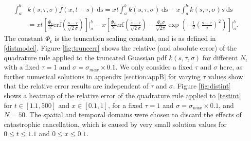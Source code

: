 \begin{equation}
    \begin{split}
\int_a^b&k(s,\tau,\sigma)f(x,t-s)\ \text{ds}=xt\int_a^bk(s,\tau,\sigma)\ \text{ds}-x\int_a^bk(s,\tau,\sigma)s\ \text{ds}\\&=xt\left[\frac{\Phi_c}{2}\text{erf}\left(\frac{s-\tau}{\sqrt{2}\sigma}\right)\right]\bigg|_a^b-x\left[\frac{\Phi_c}{2}\text{erf}\left(\frac{s-\tau}{\sqrt{2}\sigma}\right)-\frac{\Phi_c\sigma}{\sqrt{2\pi}}\exp\left(-\frac{1}{2}\left(\frac{s-\tau}{\sigma}\right)^2 \right)\right]\bigg|_a^b.
    \end{split}
\end{equation}
The constant $\Phi_c$ is the truncation scaling constant, and is as defined in \eqref{distmodel}. Figure \ref{fig:truncerr} shows the relative (and absolute error) of the quadrature rule applied to the truncated Guassian pdf $k(s,\tau,\sigma)$ for different $N$, with a fixed $\tau=1$ and $\sigma=\sigma_{max}\times0.1$. We only consider a fixed $\tau$ and $\sigma$ here, as further numerical solutions in appendix \ref{section:appB} for varying $\tau$ values show that the relative error results are independent of $\tau$ and $\sigma$. Figure \ref{fig:distint} shows a heatmap of the relative error of the quadrature rule applied to \eqref{testint} for $t\in[1.1,500]$ and $x\in[0.1,1]$, for a fixed $\tau=1$ and $\sigma=\sigma_{max}\times0.1$, and $N=50$. The spatial and temporal domains were chosen to discard the effects of catastrophic cancellation, which is caused by very small solution values for $0\leq t\leq 1.1$ and $0\leq x\leq 0.1$.


